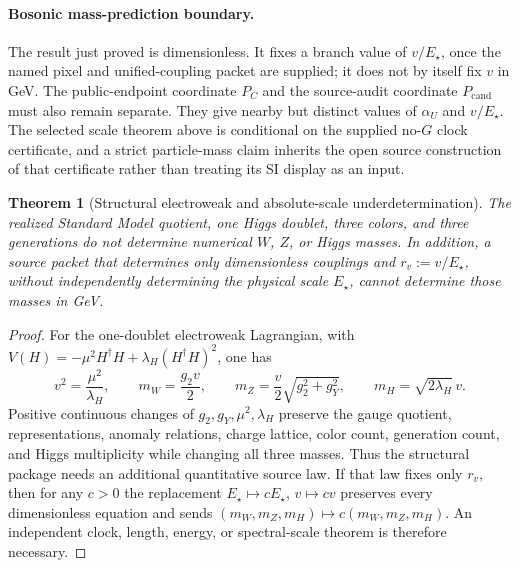 \documentclass[11pt]{article}
\newtheorem{theorem}{Theorem}[section]
\begin{document}
\paragraph{Bosonic mass-prediction boundary.}
The result just proved is dimensionless.  It fixes a branch value of
\(v/E_\star\), once the named pixel and unified-coupling packet are supplied;
it does not by itself fix \(v\) in GeV.  The public-endpoint coordinate
\(P_C\) and the source-audit coordinate \(P_{\mathrm{cand}}\) must also remain
separate.  They give nearby but distinct values of \(\alpha_U\) and
\(v/E_\star\).  The selected scale theorem above is conditional on the
supplied no-\(G\) clock certificate, and a strict particle-mass claim inherits
the open source construction of that certificate rather than treating its SI
display as an input.

\begin{theorem}[Structural electroweak and absolute-scale
underdetermination]\label{thm:boson-structural-scale-no-go}
The realized Standard Model quotient, one Higgs doublet, three colors, and
three generations do not determine numerical \(W\), \(Z\), or Higgs masses.
In addition, a source packet that determines only dimensionless couplings and
\(r_v:=v/E_\star\), without independently determining the physical scale
\(E_\star\), cannot determine those masses in GeV.
\end{theorem}

\begin{proof}
For the one-doublet electroweak Lagrangian, with
\(V(H)=-\mu^2H^\dagger H+\lambda_H(H^\dagger H)^2\), one has
\[
v^2=\frac{\mu^2}{\lambda_H},\qquad
m_W=\frac{g_2v}{2},\qquad
m_Z=\frac v2\sqrt{g_2^2+g_Y^2},\qquad
m_H=\sqrt{2\lambda_H}\,v.
\]
Positive continuous changes of \(g_2,g_Y,\mu^2,\lambda_H\) preserve the
gauge quotient, representations, anomaly relations, charge lattice, color
count, generation count, and Higgs multiplicity while changing all three
masses.  Thus the structural package needs an additional quantitative source
law.  If that law fixes only \(r_v\), then for any \(c>0\) the replacement
\(E_\star\mapsto cE_\star\), \(v\mapsto cv\) preserves every dimensionless
equation and sends \((m_W,m_Z,m_H)\mapsto c(m_W,m_Z,m_H)\).  An independent
clock, length, energy, or spectral-scale theorem is therefore necessary.
\end{proof}
\end{document}
